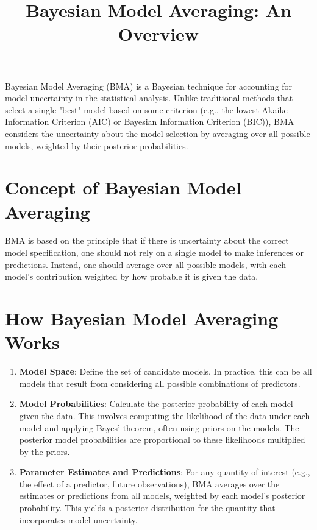 \documentclass{article}
\title{Bayesian Model Averaging: An Overview}
\author{}
\date{}
\begin{document}
\maketitle

Bayesian Model Averaging (BMA) is a  Bayesian technique for accounting for model uncertainty in the statistical analysis. Unlike traditional methods that select a single "best" model based on some criterion (e.g., the lowest Akaike Information Criterion (AIC) or Bayesian Information Criterion (BIC)), BMA considers the uncertainty about the model selection by averaging over all possible models, weighted by their posterior probabilities. 

\section*{Concept of Bayesian Model Averaging}

BMA is based on the principle that if there is uncertainty about the correct model specification, one should not rely on a single model to make inferences or predictions. Instead, one should average over all possible models, with each model's contribution weighted by how probable it is given the data.

\section*{How Bayesian Model Averaging Works}

\begin{enumerate}
    \item \textbf{Model Space}: Define the set of candidate models. In practice, this can be all models that result from considering all possible combinations of predictors.
    \item \textbf{Model Probabilities}: Calculate the posterior probability of each model given the data. This involves computing the likelihood of the data under each model and applying Bayes' theorem, often using priors on the models. The posterior model probabilities are proportional to these likelihoods multiplied by the priors.
    \item \textbf{Parameter Estimates and Predictions}: For any quantity of interest (e.g., the effect of a predictor, future observations), BMA averages over the estimates or predictions from all models, weighted by each model's posterior probability. This yields a posterior distribution for the quantity that incorporates model uncertainty.
\end{enumerate}
\end{document}
